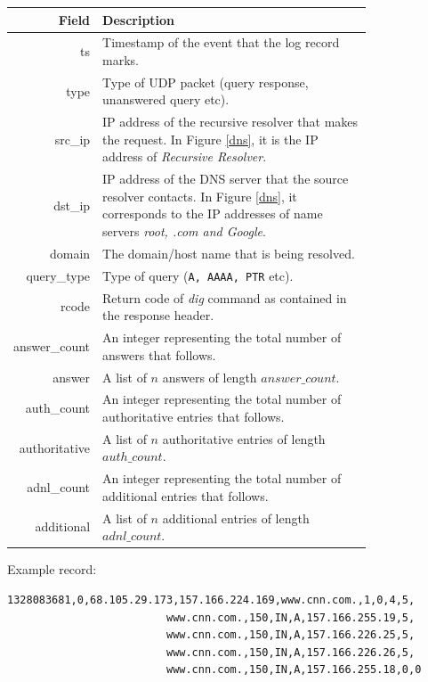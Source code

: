 \documentclass[11pt,a4paper]{article}
\begin{document}
\begin{table}[H]
\begin{tabular}{rp{0.8\linewidth}} \hline
\textbf{Field}      & \textbf{Description}\\
\hline
ts                 & Timestamp of the event that the log record marks.\\
type               & Type of UDP packet (query response, unanswered query etc).\\
src\_ip            & IP address of the recursive resolver that makes the request. In Figure \ref{dns}, it is the IP address of \textit{Recursive Resolver}.\\
dst\_ip            & IP address of the DNS server that the source resolver contacts. In Figure \ref{dns}, it corresponds to the IP addresses of name servers \textit{root, .com and Google}.\\
domain             & The domain/host name that is being resolved.\\
query\_type        & Type of query (\texttt{A, AAAA, PTR} etc).\\
rcode              & Return code of \textit{dig} command as contained in the response header.\\
answer\_count      & An integer representing the total number of answers that follows.\\
answer             & A list of $n$ answers of length $answer\_count$.\\
auth\_count        & An integer representing the total number of authoritative entries that follows.\\
authoritative      & A list of $n$ authoritative entries of length $auth\_count$.\\
adnl\_count        & An integer representing the total number of additional entries that follows.\\
additional         & A list of $n$ additional entries of length $adnl\_count$.\\

\end{tabular}
\end{table}

\newpage
\noindent
Example record:
\begin{verbatim}
1328083681,0,68.105.29.173,157.166.224.169,www.cnn.com.,1,0,4,5,
                         www.cnn.com.,150,IN,A,157.166.255.19,5,
                         www.cnn.com.,150,IN,A,157.166.226.25,5,
                         www.cnn.com.,150,IN,A,157.166.226.26,5,
                         www.cnn.com.,150,IN,A,157.166.255.18,0,0
\end{verbatim}
\end{document}
